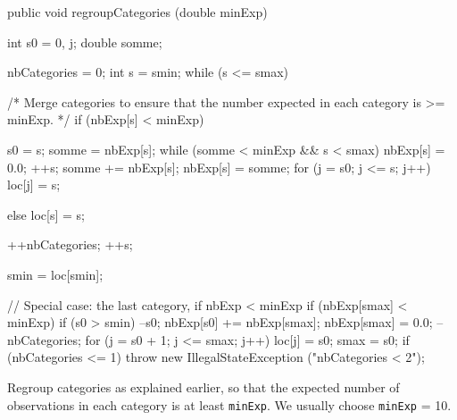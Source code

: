    \begin{code}

      public void regroupCategories (double minExp)\begin{hide} {
         int s0 = 0, j;
         double somme;

         nbCategories = 0;
         int s = smin;
         while (s <= smax) {
            /* Merge categories to ensure that the number expected
               in each category is >= minExp. */
            if (nbExp[s] < minExp) {
               s0 = s;
               somme = nbExp[s];
               while (somme < minExp && s < smax) {
                  nbExp[s] = 0.0;
                  ++s;
                  somme += nbExp[s];
               }
               nbExp[s] = somme;
               for (j = s0; j <= s; j++)
                  loc[j] = s;

            } else
               loc[s] = s;

            ++nbCategories;
            ++s;
         }
         smin = loc[smin];

         // Special case: the last category, if nbExp < minExp
         if (nbExp[smax] < minExp) {
            if (s0 > smin)
               --s0;
            nbExp[s0] += nbExp[smax];
            nbExp[smax] = 0.0;
            --nbCategories;
            for (j = s0 + 1; j <= smax; j++)
               loc[j] = s0;
            smax = s0;
         }
         if (nbCategories <= 1)
           throw new IllegalStateException ("nbCategories < 2");
         }\end{hide}
\end{code}
 \begin{tabbb}  Regroup categories as explained earlier, so that the expected
   number of observations in each category is at least \texttt{minExp}.
   We usually choose \texttt{minExp} = 10.
 \end{tabbb}
\begin{htmlonly}
\end{htmlonly}
